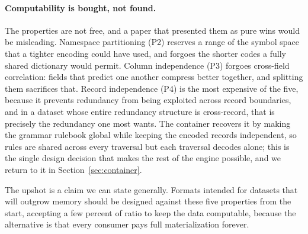 \paragraph{Computability is bought, not found.}
The properties are not free, and a paper that presented them as pure wins would be
misleading. Namespace partitioning (P2) reserves a range of the symbol space that
a tighter encoding could have used, and forgoes the shorter codes a fully shared
dictionary would permit. Column independence (P3) forgoes cross-field correlation:
fields that predict one another compress better together, and splitting them
sacrifices that. Record independence (P4) is the most expensive of the five,
because it prevents redundancy from being exploited across record boundaries, and
in a dataset whose entire redundancy structure is cross-record, that is precisely
the redundancy one most wants. The container recovers it by making the grammar
rulebook global while keeping the encoded records independent, so rules are shared
across every traversal but each traversal decodes alone; this is the single
design decision that makes the rest of the engine possible, and we return to it in
Section~\ref{sec:container}.

The upshot is a claim we can state generally. Formats intended for datasets that
will outgrow memory should be designed against these five properties from the
start, accepting a few percent of ratio to keep the data computable, because the
alternative is that every consumer pays full materialization forever.

